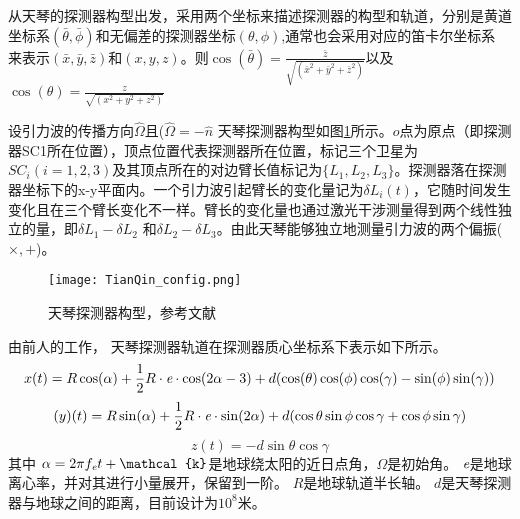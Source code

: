 从天琴的探测器构型出发\cite{luo2016tianqin}，采用两个坐标来描述探测器的构型和轨道，分别是黄道坐标系$(\bar{\theta},\bar{\phi})$和无偏差的探测器坐标$(\theta,\phi)$,通常也会采用对应的笛卡尔坐标系
来表示$(\bar{x},\bar{y},\bar{z})$和$(x,y,z)$。则$\cos(\bar{\theta})=\frac{\bar{z}}{\sqrt{(\bar{x}^2+\bar{y}^2+\bar{z}^2)}}$以及$\cos(\theta)=\frac{z}{\sqrt{(x^2+y^2+z^2)}}$

设引力波的传播方向$\hat{\Omega}$且($\hat{\Omega}=-\hat{n}$
天琴探测器构型如图\ref{fig2-LISA_con}所示。$o$点为原点（即探测器SC1所在位置），顶点位置代表探测器所在位置，标记三个卫星为$SC_i(i=1,2,3)$及其顶点所在的对边臂长值标记为$\{L_1,L_2,L_3\}$。探测器落在探测器坐标下的x-y平面内。一个引力波引起臂长的变化量记为$\delta L_i(t)$，它随时间发生变化且在三个臂长变化不一样。臂长的变化量也通过激光干涉测量得到两个线性独立的量，即$\delta L_1- \delta L_2$ 和$\delta L_2 -\delta L_3$。由此天琴能够独立地测量引力波的两个偏振($\times,+$)。

\begin{figure}[htbp]
\begin{center}
\texttt{[image: TianQin\_config.png]}
\caption{天琴探测器构型，参考文献\cite{zhang2020full}}
\label{fig2-LISA_con}
\end{center}
\end{figure}

由前人的工作\cite{hu2018fundamentals,ye2019optimizing}\cite{luo2016tianqin}\cite{tan2020impact}\cite{zhang2020full}，%
天琴探测器轨道在探测器质心坐标系下表示如下所示。
\begin{equation}
x(t)=R\cos(\alpha)+\frac{1}{2} R \cdot \emph{e} \cdot \cos(2\alpha-3) +d(\cos(\theta) \cos(\phi)\cos(\gamma)-\sin(\phi)\sin(\gamma)) 
\end{equation}
\begin{equation}
\mathcal(y)(t)= R \sin (\alpha)+\frac{1}{2}R\cdot \emph{e} \cdot \sin (2\alpha)+d(\cos \theta \sin \phi \cos \gamma + \cos \phi \sin  \gamma)
\end{equation}
\begin{equation}
z(t)=-d \sin \theta \cos \gamma
\end{equation}
其中 $\alpha = 2\pi f_{\emph{e}} t+\mathcal{k}$是地球绕太阳的近日点角，$\mathcal{\Omega}$是初始角。
$\emph{e}$是地球离心率，并对其进行小量展开，保留到一阶。
$R$是地球轨道半长轴。
$d$是天琴探测器与地球之间的距离，目前设计为$10^8$米。

